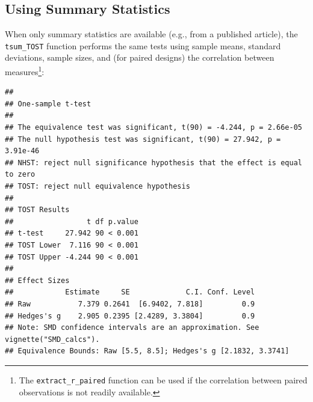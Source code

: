 \documentclass[]{interact}
\theoremstyle{plain}%
\theoremstyle{definition}
\theoremstyle{remark}
\newenvironment{Shaded}{\begin{snugshade}}{\end{snugshade}}
\newcommand{\AttributeTok}[1]{\textcolor[rgb]{0.13,0.29,0.53}{#1}}
\newcommand{\CommentTok}[1]{\textcolor[rgb]{0.56,0.35,0.01}{\textit{#1}}}
\newcommand{\ConstantTok}[1]{\textcolor[rgb]{0.56,0.35,0.01}{#1}}
\newcommand{\FloatTok}[1]{\textcolor[rgb]{0.00,0.00,0.81}{#1}}
\newcommand{\FunctionTok}[1]{\textcolor[rgb]{0.13,0.29,0.53}{\textbf{#1}}}
\newcommand{\NormalTok}[1]{#1}
\newcommand{\OtherTok}[1]{\textcolor[rgb]{0.56,0.35,0.01}{#1}}
\newcommand{\SpecialCharTok}[1]{\textcolor[rgb]{0.81,0.36,0.00}{\textbf{#1}}}
\newcommand{\StringTok}[1]{\textcolor[rgb]{0.31,0.60,0.02}{#1}}
\begin{document}
\subsection{Using Summary Statistics}\label{using-summary-statistics}

When only summary statistics are available (e.g., from a published
article), the \texttt{tsum\_TOST} function performs the same tests using
sample means, standard deviations, sample sizes, and (for paired
designs) the correlation between measures\footnote{The
  \texttt{extract\_r\_paired} function can be used if the correlation
  between paired observations is not readily available.}:

\begin{Shaded}
\end{Shaded}

\begin{verbatim}
## 
## One-sample t-test
## 
## The equivalence test was significant, t(90) = -4.244, p = 2.66e-05
## The null hypothesis test was significant, t(90) = 27.942, p = 3.91e-46
## NHST: reject null significance hypothesis that the effect is equal to zero 
## TOST: reject null equivalence hypothesis
## 
## TOST Results 
##                 t df p.value
## t-test     27.942 90 < 0.001
## TOST Lower  7.116 90 < 0.001
## TOST Upper -4.244 90 < 0.001
## 
## Effect Sizes 
##            Estimate     SE             C.I. Conf. Level
## Raw           7.379 0.2641  [6.9402, 7.818]         0.9
## Hedges's g    2.905 0.2395 [2.4289, 3.3804]         0.9
## Note: SMD confidence intervals are an approximation. See vignette("SMD_calcs").
## Equivalence Bounds: Raw [5.5, 8.5]; Hedges's g [2.1832, 3.3741]
\end{verbatim}
\end{document}
